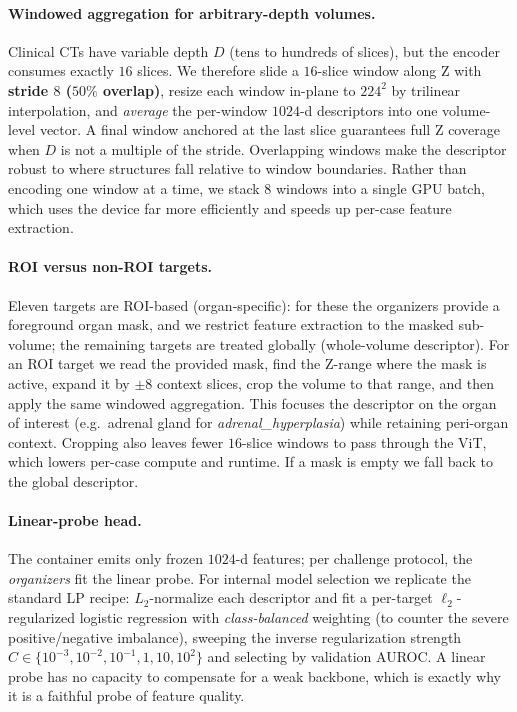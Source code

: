 \documentclass[runningheads]{llncs}
\begin{document}
\paragraph{Windowed aggregation for arbitrary-depth volumes.}
\label{sec:agg}
Clinical CTs have variable depth $D$ (tens to hundreds of slices), but the
encoder consumes exactly $16$ slices. We therefore slide a $16$-slice window
along Z with \textbf{stride $8$ ($50\%$ overlap)}, resize each window in-plane to
$224^2$ by trilinear interpolation, and \emph{average} the per-window $1024$-d
descriptors into one volume-level vector. A final window anchored at the last
slice guarantees full Z coverage when $D$ is not a multiple of the stride.
Overlapping windows make the descriptor robust to where structures fall relative
to window boundaries. Rather than encoding one window at a time, we stack $8$
windows into a single GPU batch, which uses the device far more efficiently and
speeds up per-case feature extraction.

\paragraph{ROI versus non-ROI targets.}
Eleven targets are ROI-based (organ-specific): for these the organizers provide a
foreground organ mask, and we restrict feature extraction to the masked
sub-volume; the remaining targets are treated globally (whole-volume descriptor).
For an ROI target we read the provided mask, find the Z-range where the mask is
active, expand it by $\pm 8$ context slices, crop the volume to that range, and
then apply the same windowed aggregation. This focuses the descriptor on the
organ of interest (e.g.\ adrenal gland for \emph{adrenal\_hyperplasia}) while
retaining peri-organ context. Cropping also leaves fewer $16$-slice windows to
pass through the ViT, which lowers per-case compute and runtime. If a mask is
empty we fall back to the global descriptor.

\paragraph{Linear-probe head.}
The container emits only frozen $1024$-d features; per challenge protocol, the
\emph{organizers} fit the linear probe. For internal model selection we
replicate the standard LP recipe: $L_2$-normalize each descriptor and fit a
per-target $\ell_2$-regularized logistic regression with
\emph{class-balanced} weighting (to counter the severe positive/negative
imbalance), sweeping the inverse regularization strength
$C\in\{10^{-3},10^{-2},10^{-1},1,10,10^{2}\}$ and selecting by validation AUROC.
A linear probe has no capacity to compensate for a weak backbone, which is
exactly why it is a faithful probe of feature quality.
\end{document}
